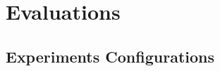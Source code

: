 \documentclass[10pt,journal]{IEEEtran}
\theoremstyle{remark}
\begin{document}
\section{Evaluations \label{s:evalu}}

\subsection{Experiments Configurations}




\end{document}
